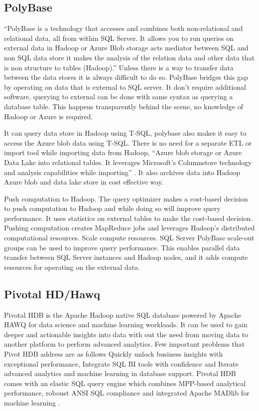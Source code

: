 \subsection{ PolyBase}

     ``PolyBase is a technology that accesses and combines both non-relational
     and relational data, all from within SQL Server. It allows you to run 
     queries on external data in Hadoop or Azure Blob storage acts 
     mediator between SQL and non SQL data store it makes the analysis 
     of the relation data and other data that is non structure to 
     tables (Hadoop).'' \cite{www-polybase} Unless there is a way to 
     transfer data between the data stores it is always difficult to do so. 
     PolyBase bridges this gap by operating on data that is external 
     to SQL server. It don’t require additional software, querying to 
     external can be done with same syntax as querying a database table. 
     This happens transparently behind the scene, no knowledge of Hadoop
     or Azure is required.

     It can query data store in Hadoop using T-SQL, polybase also makes 
     it easy to access the Azure blob data using T-SQL. There is no 
     need for a separate ETL or import tool while importing data 
     from Hadoop, ``Azure blob storage or Azure Data Lake into relational 
     tables. It leverages Microsoft’s Columnstore technology and analysis 
     capabilities while importing'' \cite{www-polybase}. It also archives 
     data into Hadoop Azure blob and data lake store in cost effective way. 

     Push computation to Hadoop. The query optimizer makes a cost-based 
     decision to push computation to Hadoop and while doing so will 
     improve query performance. It uses statistics on external tables 
     to make the cost-based decision. Pushing computation creates 
     MapReduce jobs and leverages Hadoop's distributed computational 
     resources. Scale compute resources. SQL Server PolyBase scale-out 
     groups can be used to improve query performance. This enables parallel 
     data transfer between SQL Server instances and Hadoop nodes, 
     and it adds compute resources for operating on the external data.


\subsection{ Pivotal HD/Hawq}

     Pivotal HDB is the Apache Hadoop native SQL database powered by
     Apache HAWQ \cite{www-apache-hqwq} for data science and machine
     learning workloads. It can be used to gain deeper and actionable
     insights into data with out the need from moving data to another
     platform to perform advanced analytics. Few important problems
     that Pivot HDB address are as follows Quickly unlock business
     insights with exceptional performance, Integrate SQL BI tools
     with confidence and Iterate advanced analytics and machine
     learning in database support. Pivotal HDB comes with an elastic
     SQL query engine which combines MPP-based analytical performance,
     roboust ANSI SQL compliance and integrated Apache MADlib for
     machine learning \cite{www-pivotalhdb}.
     
